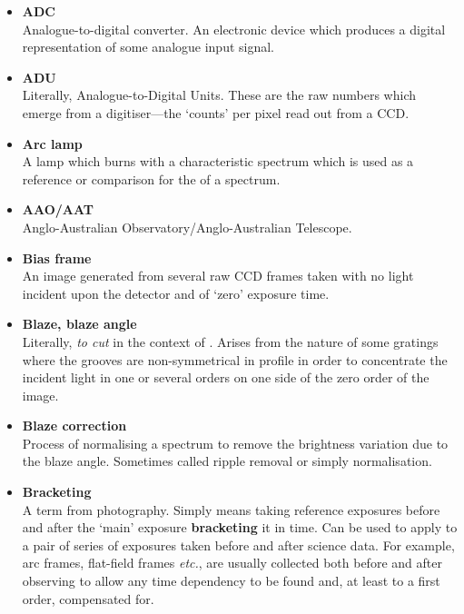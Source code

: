 \documentclass[twoside,11pt]{starlink}
\providecommand{\scspec}[2]{#1}
\begin{document}
\begin{itemize}

\item {\bf\label{gl_adc}ADC}\\
      Analogue-to-digital converter.  An electronic device which produces
      a digital representation of some analogue input signal.

\item {\bf\label{gl_adu}ADU}\\
      Literally, Analogue-to-Digital Units.  These are the raw numbers
      which emerge from a digitiser\scspec{---}{ - }the `counts' per pixel
      read out from a CCD.

\item {\bf\label{gl_arc_lamp}Arc lamp}\\
      A lamp which burns with a characteristic spectrum which is used as
      a reference or comparison for the
       of a spectrum.

\item {\bf\label{gl_aao_aat}AAO/AAT}\\
      Anglo-Australian Observatory/Anglo-Australian Telescope.

\item {\bf\label{gl_bias_frame}Bias frame}\\
      An image generated from several raw CCD frames taken with no
      light incident upon the detector and of `zero' exposure time.

\item {\bf\label{gl_blaze}Blaze, blaze angle}\\
      Literally, {\sl to cut\/} in the context of
      .
      Arises from the nature of some gratings where the grooves are
      non-symmetrical in profile in order to concentrate the incident
      light in one or several orders on one side of the zero order of
      the image.

\item {\bf\label{gl_blaze_correction}Blaze correction}\\
      Process of normalising a spectrum
      to remove the brightness variation due to the blaze angle.
      Sometimes called ripple removal or simply normalisation.

\item {\bf\label{gl_bracketing}Bracketing}\\
      A term from photography.  Simply means taking reference exposures
      before and after the `main' exposure \textbf{bracketing} it in time.
      Can be used to apply to a pair of series of exposures taken before
      and after science data.  For example, arc frames, flat-field frames
      \emph{etc.}, are usually collected both before and after observing to
      allow any time dependency to be found and, at least to a first order,
      compensated for.


\end{itemize}
\end{document}
